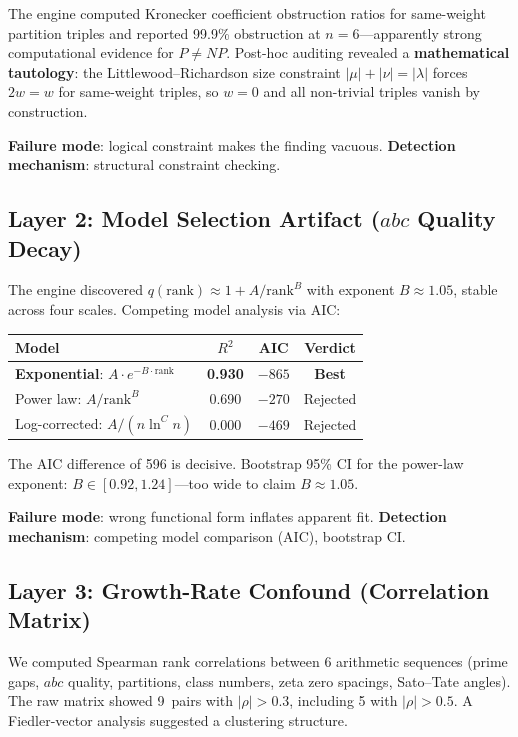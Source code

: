 \documentclass[11pt,a4paper]{article}
\begin{document}
The engine computed Kronecker coefficient obstruction ratios for
same-weight partition triples and reported 99.9\% obstruction at
$n = 6$---apparently strong computational evidence for $P \neq NP$.
Post-hoc auditing revealed a \textbf{mathematical tautology}: the
Littlewood--Richardson size constraint $|\mu|+|\nu|=|\lambda|$ forces
$2w = w$ for same-weight triples, so $w = 0$ and all non-trivial
triples vanish by construction.

\textbf{Failure mode}: logical constraint makes the finding vacuous.
\textbf{Detection mechanism}: structural constraint checking.

\subsection{Layer 2: Model Selection Artifact ($abc$ Quality Decay)}

The engine discovered $q(\text{rank}) \approx 1 + A/\text{rank}^B$
with exponent $B \approx 1.05$, stable across four scales. Competing
model analysis via AIC:

\begin{center}
\begin{tabular}{lccc}
  \toprule
  Model & $R^2$ & AIC & Verdict \\
  \midrule
  \textbf{Exponential}: $A \cdot e^{-B \cdot \text{rank}}$ & \textbf{0.930} & \textbf{$-865$} & \textbf{Best} \\
  Power law: $A/\text{rank}^B$ & 0.690 & $-270$ & Rejected \\
  Log-corrected: $A/(n \ln^C n)$ & 0.000 & $-469$ & Rejected \\
  \bottomrule
\end{tabular}
\end{center}

The AIC difference of 596 is decisive. Bootstrap 95\% CI for the
power-law exponent: $B \in [0.92, 1.24]$---too wide to claim
$B \approx 1.05$.

\textbf{Failure mode}: wrong functional form inflates apparent fit.
\textbf{Detection mechanism}: competing model comparison (AIC),
bootstrap CI.

\subsection{Layer 3: Growth-Rate Confound (Correlation Matrix)}

We computed Spearman rank correlations between 6 arithmetic sequences
(prime gaps, $abc$ quality, partitions, class numbers, zeta zero
spacings, Sato--Tate angles). The raw matrix showed 9~pairs with
$|\rho| > 0.3$, including 5 with $|\rho| > 0.5$. A Fiedler-vector
analysis suggested a clustering structure.
\end{document}

